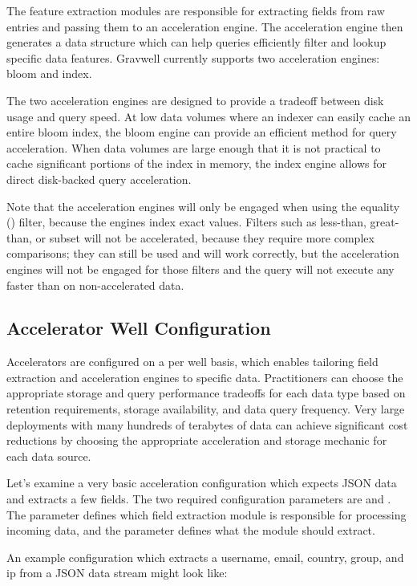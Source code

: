 {The feature extraction modules are responsible for extracting fields
from raw entries and passing them to an acceleration engine. The
acceleration engine then generates a data structure which can help
queries efficiently filter and lookup specific data features. Gravwell
currently supports two acceleration engines: bloom and index.

The two acceleration engines are designed to provide a tradeoff between
disk usage and query speed. At low data volumes where an indexer can
easily cache an entire bloom index, the bloom engine can provide an
efficient method for query acceleration. When data volumes are large
enough that it is not practical to cache significant portions of the
index in memory, the index engine allows for direct disk-backed query
acceleration.

Note that the acceleration engines will only be engaged when using
the equality (\code{==}) filter, because
the engines index exact values. Filters such as less-than, great-than,
or subset will not be accelerated, because they require more complex
comparisons; they can still be used and will work correctly, but the acceleration
engines will not be engaged for those filters and the query will
not execute any faster than on non-accelerated data.

\subsection{Accelerator Well Configuration}

Accelerators are configured on a per well basis, which enables
tailoring field extraction and acceleration engines to specific data.
Practitioners can choose the appropriate storage and query performance
tradeoffs for each data type based on retention requirements, storage
availability, and data query frequency. Very large deployments with
many hundreds of terabytes of data can achieve significant cost
reductions by choosing the appropriate acceleration and storage mechanic
for each data source.

Let's examine a very basic acceleration configuration which expects
JSON data and extracts a few fields. The two required configuration
parameters are  and . The
 parameter defines which field extraction module is
responsible for processing incoming data, and the
 parameter defines what the module should extract.

An example configuration which extracts a username, email,
country, group, and ip from a JSON data stream might look
like:

}
